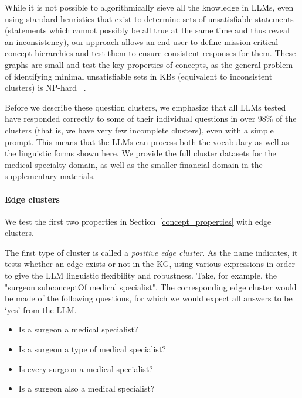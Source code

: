 \documentclass{article} %
\begin{document}
While it is not possible to algorithmically sieve all the knowledge in LLMs, even using standard heuristics that exist to determine sets of unsatisfiable statements (statements which cannot possibly be all true at the same time and thus reveal an inconsistency), our approach allows an end user to define mission critical concept hierarchies and test them to ensure consistent responses for them. These graphs are small and test the key properties of concepts, as the general problem of identifying minimal unsatisfiable sets in KBs (equivalent to inconsistent clusters) is NP-hard ~\citep{InconsistentKBs,ImplicitIncoherentInconsistent,ContradictoryRelations}.

Before we describe these question clusters, we emphasize that all LLMs tested have responded correctly to some of their individual questions in over 98\% of the clusters (that is, we have very few incomplete clusters), even with a simple prompt. This means that the LLMs can process both the vocabulary as well as the linguistic forms shown here. We provide the full cluster datasets for the medical specialty domain, as well as the smaller financial domain in the supplementary materials.

\paragraph{Edge clusters} We test the first two properties in Section~\ref{concept_properties} with edge clusters. 

The first type of cluster is called a {\em positive edge cluster}. As the name indicates, it tests whether an edge exists or not in the KG, using various expressions in order to give the LLM linguistic flexibility and robustness. Take, for example, the "surgeon subconceptOf medical specialist". The corresponding edge cluster would be made of the following questions, for which we would expect all answers to be `yes' from the LLM.

\begin{itemize} \label{sample_edge_cluster}
    \item Is a surgeon a medical specialist? 
    \item Is a surgeon a type of medical specialist? 
    \item Is every surgeon a medical specialist? 
    \item Is a surgeon also a medical specialist? 
\end{itemize}
\end{document}
